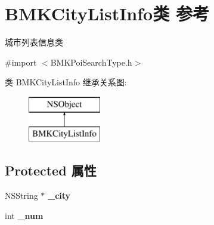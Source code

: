 \hypertarget{interface_b_m_k_city_list_info}{\section{B\+M\+K\+City\+List\+Info类 参考}
\label{interface_b_m_k_city_list_info}
}


城市列表信息类  




{\ttfamily \#import $<$B\+M\+K\+Poi\+Search\+Type.\+h$>$}

类 B\+M\+K\+City\+List\+Info 继承关系图\+:\begin{figure}[H]
\begin{center}
\leavevmode
\includegraphics[height=2.000000cm]{interface_b_m_k_city_list_info}
\end{center}
\end{figure}
\subsection*{Protected 属性}
\begin{DoxyCompactItemize}
\item 
\hypertarget{interface_b_m_k_city_list_info_a868f1df35a24867c0957420506703225}{N\+S\+String $\ast$ {\bfseries \+\_\+city}}\label{interface_b_m_k_city_list_info_a868f1df35a24867c0957420506703225}

\item 
\hypertarget{interface_b_m_k_city_list_info_a0cc9abd0bfad17b52c924611f975db77}{int {\bfseries \+\_\+num}}\label{interface_b_m_k_city_list_info_a0cc9abd0bfad17b52c924611f975db77}

\end{DoxyCompactItemize}
